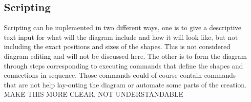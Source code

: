 \subsection{Scripting}
Scripting can be implemented in two different ways, one is to give a descriptive text input for what will the diagram include and how it will look like, but not including the exact positions and sizes of the shapes. This is not considered diagram editing and will not be discussed here. The other is to form the diagram through steps corresponding to executing commands that define the shapes and connections in sequence. Those commands could of course contain commands that are not help lay-outing the diagram or automate some parts of the creation. MAKE THIS MORE CLEAR, NOT UNDERSTANDABLE

\begin{comment}
BY CHRISTIANE
 I think you should also discuss a combination of all the methods mentioned. I think a combination would be the most feasible. You should somehow state this. 
The combination of keyboard accelerators and menu based editing is already done in many tools.
Maybe you should also briefly discuss the keyboard editing via navigating through standard tool-bars and menus by arrow keys or tab key. Of course, this is no good method. But as it is used in many tools it should be discussed here, I think. Furthermore, this method has the advantage that really every functionality of a diagramming tool could be activated if it is placed in some menu or toolbar.
\end{comment}


